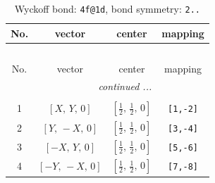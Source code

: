 \documentclass[fleqn,8pt]{jsarticle}
\begin{document}
\renewcommand{\arraystretch}{1.2}
\begin{longtable}{cccc}
\caption{Wyckoff bond: {\tt 4f@1d}, bond symmetry: {\tt 2..}}
 \\
 \hline \hline
No. & vector & center & mapping \\ \hline \endfirsthead

\multicolumn{3}{l}{\tablename\ \thetable{}} \\
 \hline \hline
No. & vector & center & mapping \\ \hline \endhead

 \hline \hline
\multicolumn{3}{r}{\footnotesize\it continued ...} \\ \endfoot

 \hline \hline
\multicolumn{3}{r}{} \\ \endlastfoot

1 & $\left[ X,\, Y,\, 0 \right]$ & $\left[ \frac{1}{2},\, \frac{1}{2},\, 0 \right]$ & {\tt [1,-2]} \\ \hline
2 & $\left[ Y,\, - X,\, 0 \right]$ & $\left[ \frac{1}{2},\, \frac{1}{2},\, 0 \right]$ & {\tt [3,-4]} \\ \hline
3 & $\left[ - X,\, Y,\, 0 \right]$ & $\left[ \frac{1}{2},\, \frac{1}{2},\, 0 \right]$ & {\tt [5,-6]} \\ \hline
4 & $\left[ - Y,\, - X,\, 0 \right]$ & $\left[ \frac{1}{2},\, \frac{1}{2},\, 0 \right]$ & {\tt [7,-8]} \\
\end{longtable}
\renewcommand{\arraystretch}{1.2}
\end{document}
